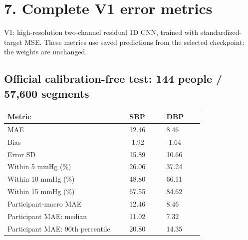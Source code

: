 \documentclass[11pt,letterpaper]{article}
\renewcommand{\arraystretch}{1.22}
\begin{document}
\section*{7. Complete V1 error metrics}
V1: high-resolution two-channel residual 1D CNN, trained with standardized-target MSE. These metrics use saved predictions from the selected checkpoint; the weights are unchanged.
\subsection*{Official calibration-free test: 144 people / 57,600 segments}
{\small\renewcommand{\arraystretch}{1.05}

\par\smallskip
\begin{tabular}{@{}p{0.57\linewidth}p{0.17\linewidth}p{0.17\linewidth}@{}}\toprule
Metric & SBP & DBP\\\midrule
MAE & 12.46 & 8.46\\
Bias & -1.92 & -1.64\\
Error SD & 15.89 & 10.66\\
Within 5 mmHg (\%) & 26.06 & 37.24\\
Within 10 mmHg (\%) & 48.80 & 66.11\\
Within 15 mmHg (\%) & 67.55 & 84.62\\
Participant-macro MAE & 12.46 & 8.46\\
Participant MAE: median & 11.02 & 7.32\\
Participant MAE: 90th percentile & 20.80 & 14.35\\
\bottomrule\end{tabular}\par\smallskip
}
\end{document}
